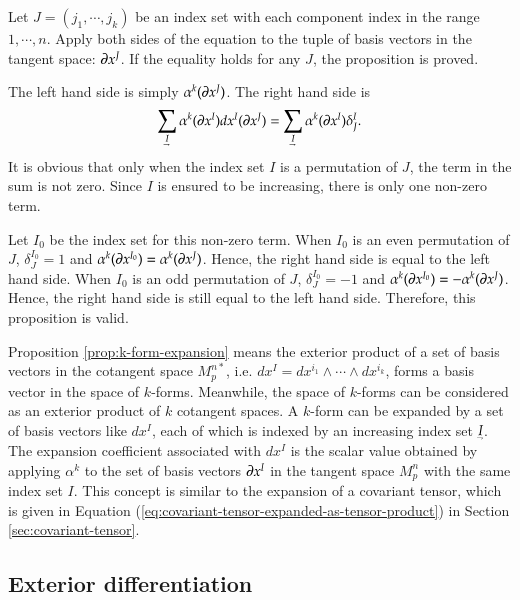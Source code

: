 \documentclass[11pt, a4paper]{book}
\begin{document}
\begin{Proof}
  Let $J = (j_1,\cdots,j_k)$ be an index set with each component index in the range
  $1,\cdots,n$. Apply both sides of the equation to the tuple of basis vectors in the
  tangent space: $\boldsymbol{\partial}x^J$. If the equality holds for any $J$, the proposition is
  proved.

  The left hand side is simply $\alpha^k(\boldsymbol{\partial}x^J)$. The right hand side is
  \begin{equation}
    \sum_{\underaccent{\rightharpoondown}{I}}\alpha^k(\vect{\pdiff}x^I)dx^I(\vect{\pdiff}x^J)
    = \sum_{\underaccent{\rightharpoondown}{I}} \alpha^k(\vect{\pdiff}x^I)\delta_J^I.
  \end{equation}
  It is obvious that only when the index set $I$ is a permutation of $J$, the term in the
  sum is not zero. Since $I$ is ensured to be increasing, there is only one non-zero term.

  Let $I_0$ be the index set for this non-zero term. When $I_0$ is an even permutation of
  $J$, $\delta_J^{I_0}=1$ and
  $\alpha^k(\boldsymbol{\partial}x^{I_0}) = \alpha^k(\boldsymbol{\partial}x^J)$. Hence, the right hand
  side is equal to the left hand side. When $I_0$ is an odd permutation of $J$,
  $\delta_J^{I_0}=-1$ and $\alpha^k(\boldsymbol{\partial}x^{I_0}) = -\alpha^k(\boldsymbol{\partial}x^J)$.
  Hence, the right hand side is still equal to the left hand side. Therefore, this
  proposition is valid.
\end{Proof}

Proposition \ref{prop:k-form-expansion} means the exterior product of a set of basis
vectors in the cotangent space $M_p^{n*}$, i.e.
$dx^I = dx^{i_1}\wedge\cdots\wedge dx^{i_k}$, forms a basis vector in the space of
$k$-forms. Meanwhile, the space of $k$-forms can be considered as an exterior product of
$k$ cotangent spaces. A $k$-form can be expanded by a set of basis vectors like $dx^I$,
each of which is indexed by an increasing index set $\underaccent{\rightharpoondown}{I}$.
The expansion coefficient associated with $dx^I$ is the scalar value obtained by applying
$\alpha^k$ to the set of basis vectors $\boldsymbol{\partial}x^I$ in the tangent space $M_p^n$
with the same index set $I$. This concept is similar to the expansion of a covariant
tensor, which is given in Equation (\ref{eq:covariant-tensor-expanded-as-tensor-product})
in Section \ref{sec:covariant-tensor}.

\subsection{Exterior differentiation}
\end{document}
